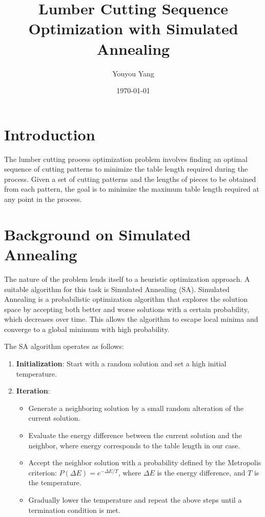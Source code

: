 \documentclass{article}
\title{Lumber Cutting Sequence Optimization with Simulated Annealing}
\author{Youyou Yang}
\date{\today}
\begin{document}
\maketitle



\section{Introduction}
The lumber cutting process optimization problem involves finding an optimal sequence of cutting patterns to minimize the table length required during the process. Given a set of cutting patterns and the lengths of pieces to be obtained from each pattern, the goal is to minimize the maximum table length required at any point in the process.

\section{Background on Simulated Annealing}

The nature of the problem lends itself to a heuristic optimization approach. A suitable algorithm for this task is Simulated Annealing (SA). Simulated Annealing is a probabilistic optimization algorithm that explores the solution space by accepting both better and worse solutions with a certain probability, which decreases over time. This allows the algorithm to escape local minima and converge to a global minimum with high probability. 

The SA algorithm operates as follows:
\begin{enumerate}
    \item \textbf{Initialization}: Start with a random solution and set a high initial temperature.
    \item \textbf{Iteration}:
    \begin{itemize}
        \item Generate a neighboring solution by a small random alteration of the current solution.
        \item Evaluate the energy difference between the current solution and the neighbor, where energy corresponds to the table length in our case.
        \item Accept the neighbor solution with a probability defined by the Metropolis criterion: \( P(\Delta E) = e^{-\Delta E / T} \), where \( \Delta E \) is the energy difference, and \( T \) is the temperature.
        \item Gradually lower the temperature and repeat the above steps until a termination condition is met.
    \end{itemize}
\end{enumerate}
\end{document}
